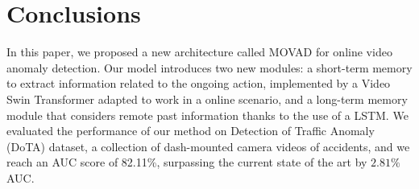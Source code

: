 \section{Conclusions}
\label{sec:conclusions}

In this paper, we proposed a new architecture called MOVAD for online  video anomaly detection.
Our model introduces two new modules: a short-term memory to extract information related to the ongoing action, implemented by a Video Swin Transformer adapted to work in a online scenario, and a long-term memory module that considers remote past information thanks to the use of a LSTM.
We evaluated the performance of our method on Detection of Traffic Anomaly (DoTA) dataset, a collection of dash-mounted camera videos of accidents, and we reach an AUC score of 82.11\%, surpassing the current state of the art by $2.81\%$ AUC.